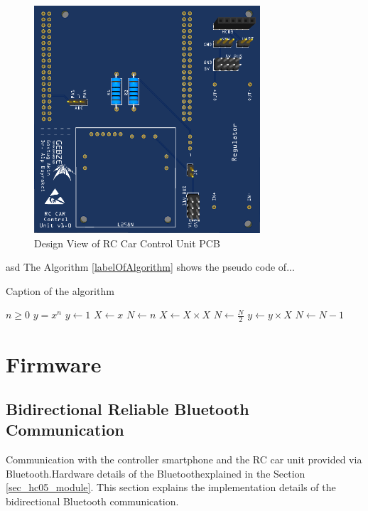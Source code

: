 \begin{figure}[!htbp]
    \centering
    \includegraphics[width=0.75\textwidth]{Imgs/pcb.png}
    \caption{\label{fig:custom_pcb}Design View of RC Car Control Unit PCB}
\end{figure}

asd
The Algorithm \ref{labelOfAlgorithm} shows the pseudo code of...
\begin{algorithm}
\caption{Caption of the algorithm}
\label{labelOfAlgorithm}
\begin{algorithmic}
\Require $n \geq 0$ %
\Ensure $y = x^n$  %
\State $y \gets 1$
\State $X \gets x$
\State $N \gets n$
    \State $X \gets X \times X$
    \State $N \gets \frac{N}{2}$  
    \State $y \gets y \times X$
    \State $N \gets N - 1$
\EndIf
\EndWhile
\end{algorithmic}
\end{algorithm}

\section{Firmware} \label{sec_firmware_design}

\subsection{Bidirectional Reliable Bluetooth Communication} \label{sec_bluetooth_comm}

Communication with the controller smartphone and the RC car unit provided via Bluetooth\texttrademark.\;Hardware details of the Bluetooth\texttrademark\;explained in the Section \ref{sec_hc05_module}. This section explains the implementation details of the bidirectional Bluetooth\texttrademark\; communication.

